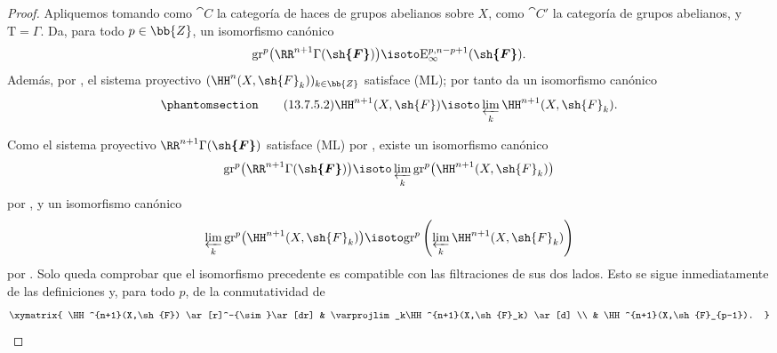 \documentclass[oneside]{amsart}
\newcommand{\oldpage}[2][]{{\marginnote{\normalfont\textbf{#1}~|~#2}}\ignorespaces}
\let\EGAOriginalLabel\label
\renewcommand{\label}[1]{\phantomsection\EGAOriginalLabel{#1}}
\begin{document}
\begin{proof}
\oldpage[0\textsubscript{III}]{77}
Apliquemos  tomando como $\cat{C}$ la categoría de haces de
grupos abelianos sobre $X$, como $\cat{C}'$ la categoría de grupos abelianos,
y $\mathrm{T}=\Gamma$.
Da, para todo $p\in\bb{Z}$, un isomorfismo canónico
\[
  \mathrm{gr}^p\bigl(\RR^{n+1}\Gamma(\boldsymbol{\sh{F}})\bigr)
  \isoto
  \mathrm{E}_\infty^{p,n-p+1}(\boldsymbol{\sh{F}}).
\]
Además, por , el sistema proyectivo
$(\HH^n(X,\sh{F}_k))_{k\in\bb{Z}}$ satisface {\rm(ML)}; por tanto
 da un isomorfismo canónico
\[
\label{0.13.7.5.1b}
\tag{13.7.5.2}
  \HH^{n+1}(X,\sh{F})
  \isoto
  \varprojlim_k\HH^{n+1}(X,\sh{F}_k).
\]

Como el sistema proyectivo
$\RR^{n+1}\Gamma(\boldsymbol{\sh{F}})$ satisface {\rm(ML)} por
, existe un isomorfismo canónico
\[
  \mathrm{gr}^p\bigl(\RR^{n+1}\Gamma(\boldsymbol{\sh{F}})\bigr)
  \isoto
  \varprojlim_k
  \mathrm{gr}^p\bigl(\HH^{n+1}(X,\sh{F}_k)\bigr)
\]
por , y un isomorfismo canónico
\[
  \varprojlim_k
  \mathrm{gr}^p\bigl(\HH^{n+1}(X,\sh{F}_k)\bigr)
  \isoto
  \mathrm{gr}^p\left(
    \varprojlim_k\HH^{n+1}(X,\sh{F}_k)
  \right)
\]
por .
Solo queda comprobar que el isomorfismo precedente es
compatible con las filtraciones de sus dos lados.
Esto se sigue inmediatamente de las definiciones y, para todo $p$,
de la conmutatividad de
\[
  \xymatrix{
    \HH^{n+1}(X,\sh{F})
      \ar[r]^-{\sim}\ar[dr]
    &
    \varprojlim_k\HH^{n+1}(X,\sh{F}_k)
      \ar[d]
    \\
    &
    \HH^{n+1}(X,\sh{F}_{p-1}).
  }
\]
\end{proof}
\end{document}
